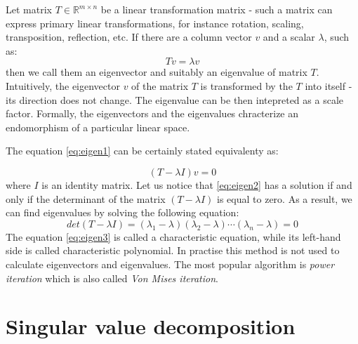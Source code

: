 \begin{appendices}
Let matrix $T \in \mathbb{R}^{m \times n}$ be a linear transformation matrix - such a matrix can express primary linear transformations, for instance rotation, scaling, transposition, reflection, etc. If there are a column vector $v$ and a scalar $\lambda$, such as:
\begin{equation}\label{eq:eigen1}
    Tv=\lambda{v}
\end{equation}
then we call them an eigenvector and suitably an eigenvalue of matrix $T$. Intuitively, the  eigenvector $v$ of the matrix $T$ is transformed by the $T$ into itself - its direction does not change. The eigenvalue can be then intepreted as a scale factor. Formally, the eigenvectors and the eigenvalues chracterize an endomorphism of a particular linear space.  

The equation \ref{eq:eigen1} can be certainly stated equivalenty as:

\begin{equation}\label{eq:eigen2}
    (T-\lambda{I})v=0
\end{equation}
where $I$ is an identity matrix. Let us notice that \ref{eq:eigen2} has a solution if and only if the determinant of the matrix $(T-\lambda{I})$ is equal to zero. As a result, we can find eigenvalues by solving the following equation:
\begin{equation}\label{eq:eigen3}
    det(T-\lambda{I}) = (\lambda_1-\lambda)(\lambda_2-\lambda)\cdots(\lambda_n-\lambda) = 0
\end{equation}
The equation \ref{eq:eigen3} is called a characteristic equation, while its left-hand side is called characteristic polynomial. In practise this method is not used to calculate eigenvectors and eigenvalues. The most popular algorithm is \textit{power iteration} which is also called \textit{Von Mises iteration}.


\newpage
\section{Singular value decomposition}
\label{app:svd}


\end{appendices}
